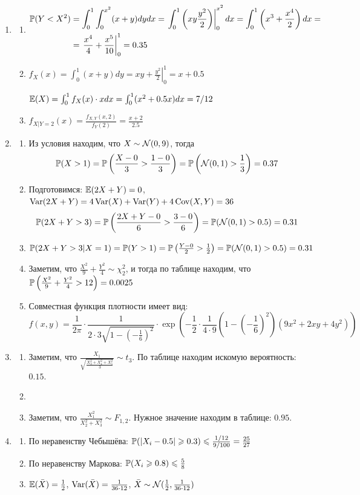 \begin{enumerate}
\item
\begin{enumerate}
\item
\begin{align*}
\P(Y<X^2) &= \int_0^1 \int_0^{x^2} (x+y) dy dx = \left. \int_0^1 \left(xy \frac{y^2}{2} \right) \right|_0^{x^2} dx =  \int_0^1 \left(x^3 + \frac{x^4}{2} \right) dx = \\
&= \left. \frac{x^4}{4} + \frac{x^5}{10} \right|_0^1 = 0.35
\end{align*}
\item $f_X (x) = \int_0^1 (x+y) dy = \left. xy + \frac{y^2}{2} \right|_0^1 = x + 0.5$

$\E(X) = \int_0^1 f_X (x) \cdot x dx = \int_0^1 (x^2 + 0.5x) dx = 7/12$
\item $f_{X|Y=2}(x) = \frac{f_{X, Y}(x, 2)}{f_Y (2)} = \frac{x+2}{2.5}$
\end{enumerate}
\item
\begin{enumerate}
\item Из условия находим, что $X \sim \cN (0, 9)$, тогда
\[
\P(X>1) = \P \left(\frac{X-0}{3} > \frac{1-0}{3} \right) = \P\left(\cN(0,1) > \frac{1}{3} \right) = 0.37
\]
\item Подготовимся: $\E(2X+Y) = 0$, $\Var(2X+Y) = 4\Var(X) + \Var(Y) + 4 \Cov(X, Y) = 36$
\[
\P(2X+Y > 3) = \P\left(\frac{2X+Y-0}{6} > \frac{3-0}{6} \right) = \P(\cN(0, 1) > 0.5) = 0.31
\]
\item $ \P(2X+Y > 3 | X=1) = \P(Y > 1) = \P \left(\frac{Y-0}{2} > \frac{1}{2} \right) = \P(\cN(0, 1) > 0.5) = 0.31$
\item Заметим, что $\frac{X^2}{9}+\frac{Y^2}{4} \sim \chi^2_2$,
и тогда по таблице находим, что $\P\left(\frac{X^2}{9}+\frac{Y^2}{4} >12\right) = 0.0025$
\item Совместная функция плотности имеет вид:
\[
f(x, y) = \frac{1}{2\pi}\cdot \frac{1}{2\cdot 3\sqrt{1- \left(-\frac{1}{6}\right)^2}}\cdot \exp \left(- \frac{1}{2} \cdot \frac{1}{4\cdot9} \left(1- \left(-\frac{1}{6}\right)^2\right) \left(9x^2 + 2xy + 4y^2 \right) \right)
\]
\end{enumerate}
\item
\begin{enumerate}
\item Заметим, что $\frac{X_1}{\sqrt{\frac{X_3^2+X_4^2+X_5^2}{3}}} \sim t_3$.
По таблице находим искомую вероятность: $0.15$.
\item
\item Заметим, что $\frac{X_1^2}{X_2^2+X_3^2} \sim F_{1, 2}$.
Нужное значение находим в таблице: $0.95$.
\end{enumerate}
\item
\begin{enumerate}
\item По неравенству Чебышёва: $ \P(|X_i-0.5|\geqslant 0.3) \leqslant \frac{1/12}{9/100} = \frac{25}{27}$
\item По неравенству Маркова: $\P(X_i \geqslant 0.8) \leqslant \frac{5}{8}$
\item $\E(\bar{X}) = \frac{1}{2}$, $\Var(\bar{X}) = \frac{1}{36\cdot 12}$, $\bar{X}\sim\cN(\frac{1}{2}, \frac{1}{36\cdot12})$


\end{enumerate}
\end{enumerate}

